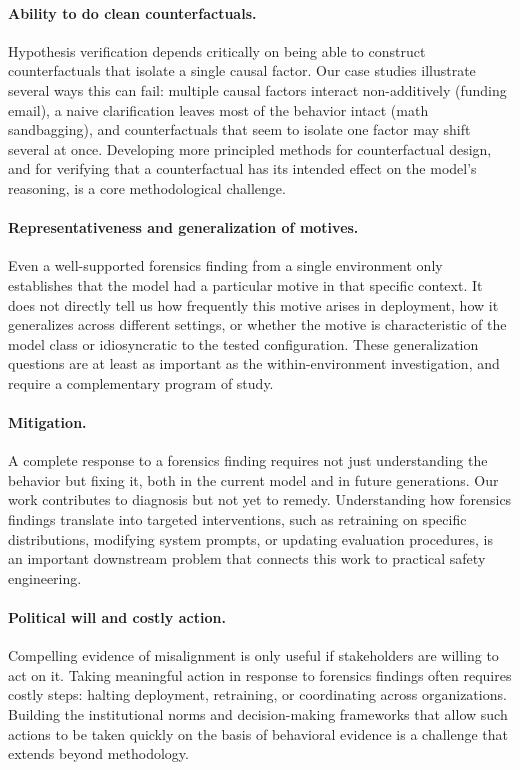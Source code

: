 \documentclass{article}
\begin{document}
\paragraph{Ability to do clean counterfactuals.} Hypothesis verification depends critically on being able to construct counterfactuals that isolate a single causal factor. Our case studies illustrate several ways this can fail: multiple causal factors interact non-additively (funding email), a naive clarification leaves most of the behavior intact (math sandbagging), and counterfactuals that seem to isolate one factor may shift several at once. Developing more principled methods for counterfactual design, and for verifying that a counterfactual has its intended effect on the model's reasoning, is a core methodological challenge.

\paragraph{Representativeness and generalization of motives.} Even a well-supported forensics finding from a single environment only establishes that the model had a particular motive in that specific context. It does not directly tell us how frequently this motive arises in deployment, how it generalizes across different settings, or whether the motive is characteristic of the model class or idiosyncratic to the tested configuration. These generalization questions are at least as important as the within-environment investigation, and require a complementary program of study.

\paragraph{Mitigation.} A complete response to a forensics finding requires not just understanding the behavior but fixing it, both in the current model and in future generations. Our work contributes to diagnosis but not yet to remedy. Understanding how forensics findings translate into targeted interventions, such as retraining on specific distributions, modifying system prompts, or updating evaluation procedures, is an important downstream problem that connects this work to practical safety engineering.

\paragraph{Political will and costly action.} Compelling evidence of misalignment is only useful if stakeholders are willing to act on it. Taking meaningful action in response to forensics findings often requires costly steps: halting deployment, retraining, or coordinating across organizations. Building the institutional norms and decision-making frameworks that allow such actions to be taken quickly on the basis of behavioral evidence is a challenge that extends beyond methodology.

\newpage

\end{document}
